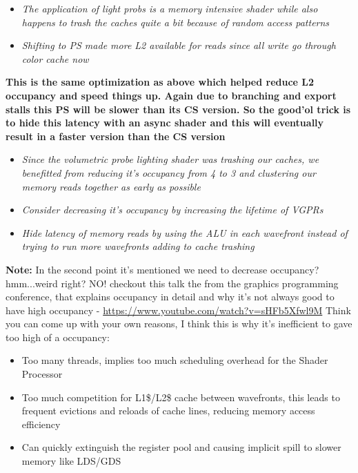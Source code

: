 \documentclass[14pt]{article}
\begin{document}
\begin{itemize}
	\item \textit{The application of light probs is a memory intensive shader while also happens to trash the caches quite a bit because of random access patterns}
	
	\item \textit{Shifting to PS made more L2 available for reads since all write go through color cache now}
\end{itemize}

	\textbf{This is the same optimization as above which helped reduce L2 occupancy and speed things up. Again due to branching and export stalls this PS will be slower than its CS version. So the good'ol trick is to hide this latency with an async shader and this will eventually result in a faster version than the CS version}


\begin{itemize}
	\item \textit{Since the volumetric probe lighting shader was trashing our caches, we benefitted from reducing it's occupancy from 4 to 3 and clustering our memory reads together as early as possible}
	
	\item \textit{Consider decreasing it's occupancy by increasing the lifetime of VGPRs}
	
	\item \textit{Hide latency of memory reads by using the ALU in each wavefront instead of trying to run more wavefronts adding to cache trashing}
\end{itemize}

	\textbf{Note:} In the second point it's mentioned we need to decrease occupancy? hmm...weird right? NO! checkout this talk the from the graphics programming conference, that explains occupancy in detail and why it's not always good to have high occupancy\cite{occu} - \url{https://www.youtube.com/watch?v=sHFb5Xfwl9M}
	Think you can come up with your own reasons, I think this is why it's inefficient to gave too high of a occupancy:
	\begin{itemize}
		\item Too many threads, implies too much scheduling overhead for the Shader Processor
		\item Too much competition for L1\$/L2\$ cache between wavefronts, this leads to frequent evictions and reloads of cache lines, reducing memory access efficiency
		\item Can quickly extinguish the register pool and causing implicit spill to slower memory like LDS/GDS
	\end{itemize}
		
\end{document}
